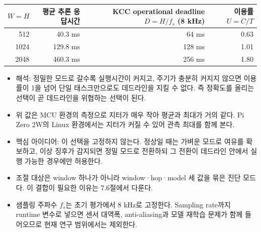 \documentclass[10pt]{article}
\begin{document}
\begin{center}\footnotesize
\begin{tabular}{@{}rrrr@{}}
\toprule
$W=H$ & 평균 추론 응답시간 & KCC operational deadline $D=H/f_s$ (8 kHz) & 이용률 $U=C/T$ \\ \midrule
512 & 40.3 ms & 64 ms & 0.63 \\
1024 & 129.8 ms & 128 ms & 1.01 \\
2048 & 460.3 ms & 256 ms & 1.80 \\
\bottomrule
\end{tabular}
\end{center}
\begin{itemize}
\item 해석: 정밀한 모드로 갈수록 실행시간이 커지고, 주기가 충분히 커지지 않으면 이용률이 1을 넘어 단일 태스크만으로도 데드라인을 지킬 수 없다. 즉 정확도를 올리는 선택이 곧 데드라인을 위협하는 선택이 된다.
\item 위 값은 MCU 환경의 측정으로 지터가 매우 작아 평균과 최대가 거의 같다. Pi Zero 2W의 Linux 환경에서는 지터가 커질 수 있어 관측 최대를 함께 본다.
\item 핵심 아이디어: 이 선택을 고정하지 않는다. 정상일 때는 가벼운 모드로 여유를 확보하고, 이상 징후가 감지되면 정밀 모드로 전환하되 그 전환이 데드라인 안에서 실행 가능한 경우에만 허용한다.
\item 조절 대상은 window 하나가 아니라 window·hop·model 세 값을 묶은 진단 모드다. 이 결합이 필요한 이유는 7.6절에서 다룬다.
\item 샘플링 주파수 $f_s$는 초기 평가에서 8 kHz로 고정한다. Sampling rate까지 runtime 변수로 넣으면 센서 대역폭, anti-aliasing과 모델 재학습 문제가 함께 들어오므로 현재 연구 범위에서는 제외한다.
\end{itemize}
\noindent{}
\end{document}

